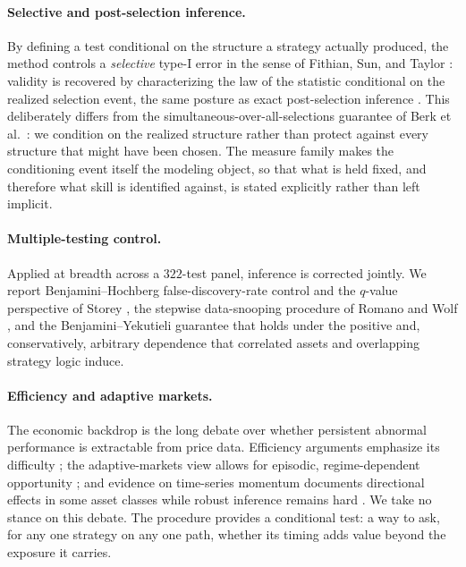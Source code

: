 \documentclass[preprint,12pt]{elsarticle}
\theoremstyle{definition}
\begin{document}
\paragraph{Selective and post-selection inference.} By defining a test conditional on the
structure a strategy actually produced, the method controls a \emph{selective} type-I
error in the sense of Fithian, Sun, and Taylor \cite{FithianSunTaylor2014}: validity is
recovered by characterizing the law of the statistic conditional on the realized selection
event, the same posture as exact post-selection inference \cite{LeeSunSunTaylor2016}. This
deliberately differs from the simultaneous-over-all-selections guarantee of Berk et al.\
\cite{BerkBrownBujaZhangZhao2013}: we condition on the realized structure rather than
protect against every structure that might have been chosen. The measure family makes the
conditioning event itself the modeling object, so that what is held fixed, and therefore
what skill is identified against, is stated explicitly rather than left implicit.

\paragraph{Multiple-testing control.} Applied at breadth across a $322$-test panel,
inference is corrected jointly. We report Benjamini--Hochberg \cite{benjaminihochberg1995}
false-discovery-rate control and the $q$-value perspective of Storey \cite{Storey2002},
the stepwise data-snooping procedure of Romano and Wolf \cite{romanowolf2005}, and the
Benjamini--Yekutieli \cite{BenjaminiYekutieli2001} guarantee that holds under the positive
and, conservatively, arbitrary dependence that correlated assets and overlapping strategy
logic induce.

\paragraph{Efficiency and adaptive markets.} The economic backdrop is the long debate over
whether persistent abnormal performance is extractable from price data. Efficiency
arguments emphasize its difficulty \cite{fama1970}; the adaptive-markets view allows for
episodic, regime-dependent opportunity \cite{lo2004}; and evidence on time-series momentum
documents directional effects in some asset classes while robust inference remains hard
\cite{moskowitz2012}. We take no stance on this debate. The procedure provides a
conditional test: a way to ask, for any one strategy on any one path, whether its timing
adds value beyond the exposure it carries.
\end{document}
